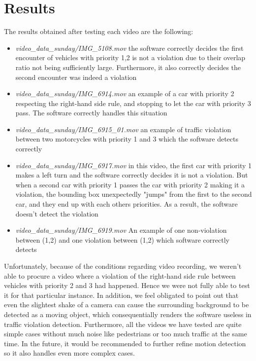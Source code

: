 \documentclass[12pt]{article} %
\begin{document}
\section{Results} %
The results obtained after testing each video are the following:
\begin{itemize}
 \item  \textit{video\_data\_sunday/IMG\_5108.mov} the software correctly decides the first encounter of vehicles with priority 1,2 is not a violation due to their overlap ratio not being sufficiently large. Furthermore, it also correctly decides the second encounter was indeed a violation
 \item  \textit{video\_data\_sunday/IMG\_6914.mov} an example of a car with priority 2 respecting the right-hand side rule, and stopping to let the car with priority 3 pass. The software correctly handles this situation 
 \item  \textit{video\_data\_sunday/IMG\_6915\_01.mov} an example of traffic violation between two motorcycles with priority 1 and 3 which the software detects correctly 
 \item  \textit{video\_data\_sunday/IMG\_6917.mov} in this video, the first car with priority 1 makes a left turn and the software correctly decides it is not a violation. But when a second car with priority 1 passes the car with priority 2 making it a violation, the bounding box unexpectedly "jumps" from the first to the second car, and they end up with each others priorities. As a result, the software doesn't detect the violation
 \item  \textit{video\_data\_sunday/IMG\_6919.mov} An example of one non-violation between (1,2) and one violation between (1,2) which software correctly detects
\end{itemize}


Unfortunately, because of the conditions regarding video recording, we weren't able to procure a video where a violation of the right-hand side rule between vehicles with priority 2 and 3 had happened. Hence we were not fully able to test it for that particular instance.
In addition, we feel obligated to point out that even the slightest shake of a camera can cause the surrounding background to be detected as a moving object, which consequentially renders the software useless in traffic violation detection. 
Furthermore, all the videos we have tested are quite simple cases without much noise like pedestrians or too much traffic at the same time. In the future, it would be recommended to further refine motion detection so it also handles even more complex cases.
\end{document}
